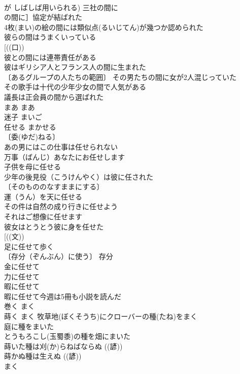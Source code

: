\documentclass[8pt]{extreport}
\begin{document}
\begin{CJK}{UTF8}{min}
\\	が しばしば用いられる) 三社の間に
\\	の間に］協定が結ばれた 
\\	4枚(まい)の絵の間には類似点(るいじてん)が幾つか認められた 
\\	彼らの間はうまくいっている 
\\	[((口)) 
\\	彼との間には連帯責任がある 
\\	彼はギリシア人とフランス人の間に生まれた 
\\	〔あるグループの人たちの範囲〕 その男たちの間に女が2人混じっていた 
\\	その歌手は十代の少年少女の間で人気がある 
\\	議長は正会員の間から選ばれた 
\\	まあ	まあ	
\\	迷子	まいご	
\\	任せる	まかせる	
\\	〔委(ゆだ)ねる〕
\\	あの男にはこの仕事は任せられない 
\\	万事（ばんじ）あなたにお任せします 
\\	子供を母に任せる 
\\	少年の後見役（こうけんやく）は彼に任された 
\\	〔そのもののなすままにする〕 
\\	運（うん）を天に任せる 
\\	その件は自然の成り行きに任せよう 
\\	それはご想像に任せます 
\\	彼女はとうとう彼に身を任せた 
\\	[((文))
\\	足に任せて歩く 
\\	〔存分（ぞんぶん）に使う〕 存分　
\\	金に任せて 
\\	力に任せて 
\\	暇に任せて 
\\	暇に任せて今週は5冊も小説を読んだ 
\\	巻く	まく	
\\	蒔く	まく	牧草地(ぼくそうち)にクローバーの種(たね)をまく 
\\	庭に種をまいた 
\\	とうもろこし(玉蜀黍)の種を畑にまいた 
\\	蒔いた種は刈(か)らねばならぬ ((諺)) 
\\	蒔かぬ種は生えぬ ((諺)) 
\\	まく	

\end{CJK}
\end{document}
